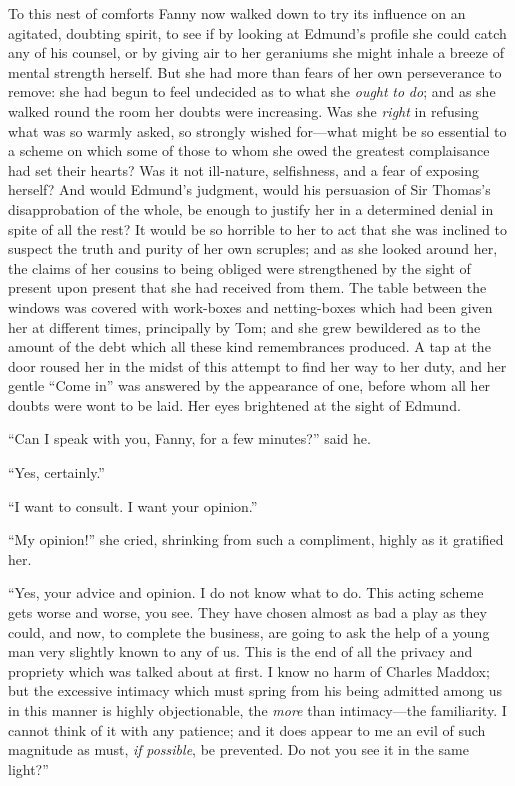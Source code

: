\documentclass{article}
\begin{document}
To this nest of comforts Fanny now walked down to try
its influence on an agitated, doubting spirit, to see
if by looking at Edmund's profile she could catch any of
his counsel, or by giving air to her geraniums she might
inhale a breeze of mental strength herself.  But she had
more than fears of her own perseverance to remove:  she had
begun to feel undecided as to what she \emph{ought} \emph{to} \emph{do};
and as she walked round the room her doubts were increasing.
Was she \emph{right} in refusing what was so warmly asked,
so strongly wished for---what might be so essential
to a scheme on which some of those to whom she owed the
greatest complaisance had set their hearts?  Was it not
ill-nature, selfishness, and a fear of exposing herself?
And would Edmund's judgment, would his persuasion of Sir
Thomas's disapprobation of the whole, be enough to justify
her in a determined denial in spite of all the rest?
It would be so horrible to her to act that she was inclined
to suspect the truth and purity of her own scruples;
and as she looked around her, the claims of her cousins
to being obliged were strengthened by the sight of
present upon present that she had received from them.
The table between the windows was covered with work-boxes
and netting-boxes which had been given her at different times,
principally by Tom; and she grew bewildered as to the amount
of the debt which all these kind remembrances produced.
A tap at the door roused her in the midst of this attempt
to find her way to her duty, and her gentle ``Come in''
was answered by the appearance of one, before whom all her
doubts were wont to be laid.  Her eyes brightened at the
sight of Edmund.

``Can I speak with you, Fanny, for a few minutes?''
said he.

``Yes, certainly.''

``I want to consult.  I want your opinion.''

``My opinion!'' she cried, shrinking from such a compliment,
highly as it gratified her.

``Yes, your advice and opinion.  I do not know what to do.
This acting scheme gets worse and worse, you see.
They have chosen almost as bad a play as they could,
and now, to complete the business, are going to ask the
help of a young man very slightly known to any of us.
This is the end of all the privacy and propriety which was
talked about at first.  I know no harm of Charles Maddox;
but the excessive intimacy which must spring from his being
admitted among us in this manner is highly objectionable,
the \emph{more} than intimacy---the familiarity.  I cannot think
of it with any patience; and it does appear to me an evil
of such magnitude as must, \emph{if} \emph{possible}, be prevented.
Do not you see it in the same light?''
\end{document}
